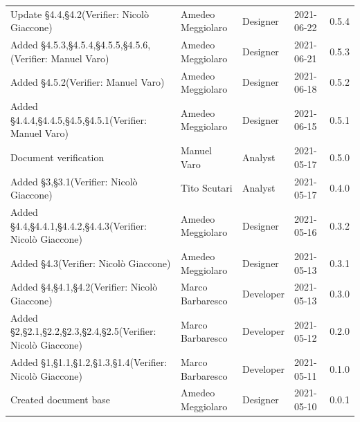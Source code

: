 \documentclass[a4paper]{article}
\begin{document}
\begin{center}
\begin{table}[h!]
\begin{tabular}{p{150px} p{90px} p{80px} p{60px} p{45px}}
            Update \S{4.4},\S{4.2}\newline(Verifier: Nicolò Giaccone)                              & Amedeo Meggiolaro & Designer      & 2021-06-22    & 0.5.4            \\
            Added \S{4.5.3},\S{4.5.4},\S{4.5.5},\S{4.5.6},\newline(Verifier: Manuel Varo)          & Amedeo Meggiolaro & Designer      & 2021-06-21    & 0.5.3            \\
            Added \S{4.5.2}\newline(Verifier: Manuel Varo)                                         & Amedeo Meggiolaro & Designer      & 2021-06-18    & 0.5.2            \\
            Added \S{4.4.4},\S{4.4.5},\S{4.5},\S{4.5.1}\newline(Verifier: Manuel Varo)             & Amedeo Meggiolaro & Designer      & 2021-06-15    & 0.5.1            \\
            Document verification                                                                  & Manuel Varo       & Analyst       & 2021-05-17    & 0.5.0            \\
            Added \S{3},\S{3.1}\newline(Verifier: Nicolò Giaccone)                                 & Tito Scutari      & Analyst       & 2021-05-17    & 0.4.0            \\
            Added \S{4.4},\S{4.4.1},\S{4.4.2},\S{4.4.3}\newline(Verifier: Nicolò Giaccone)         & Amedeo Meggiolaro & Designer      & 2021-05-16    & 0.3.2            \\
            Added \S{4.3}\newline(Verifier: Nicolò Giaccone)                                       & Amedeo Meggiolaro & Designer      & 2021-05-13    & 0.3.1            \\
            Added \S{4},\S{4.1},\S{4.2}\newline(Verifier: Nicolò Giaccone)                         & Marco Barbaresco  & Developer     & 2021-05-13    & 0.3.0            \\
            Added \S{2},\S{2.1},\S{2.2},\S{2.3},\S{2.4},\S{2.5}\newline(Verifier: Nicolò Giaccone) & Marco Barbaresco  & Developer     & 2021-05-12    & 0.2.0            \\
            Added \S{1},\S{1.1},\S{1.2},\S{1.3},\S{1.4}\newline(Verifier: Nicolò Giaccone)         & Marco Barbaresco  & Developer     & 2021-05-11    & 0.1.0            \\
            Created document base                                                                  & Amedeo Meggiolaro & Designer      & 2021-05-10    & 0.0.1            \\
        \end{tabular}
    \end{table}
\end{center}

\newpage
\tableofcontents
\newpage
\newpage
\listoffigures
\newpage






\end{document}
